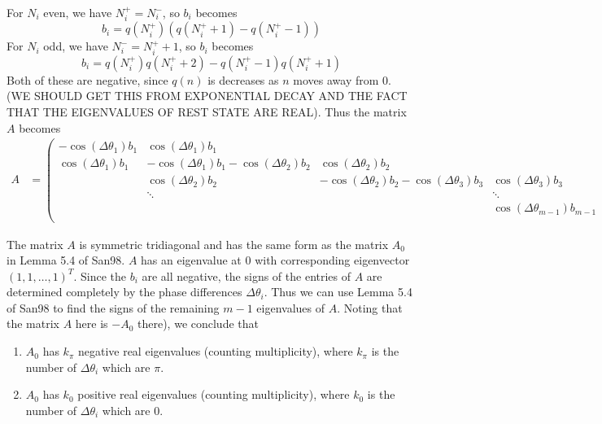 \documentclass[12pt]{article}
\begin{document}
For $N_i$ even, we have $N_i^+ = N_i^-$, so $b_i$ becomes
\[
b_i = q(N_i^+)( q(N_i^+ + 1) - q(N_i^+ - 1) )
\]
For $N_i$ odd, we have $N_i^- = N_i^+ + 1$, so $b_i$ becomes
\[
b_i = q(N_i^+)q(N_i^+ + 2) - q(N_i^+ - 1)q(N_i^+ + 1)
\]
Both of these are negative, since $q(n)$ is decreases as $n$ moves away from 0. (WE SHOULD GET THIS FROM EXPONENTIAL DECAY AND THE FACT THAT THE EIGENVALUES OF REST STATE ARE REAL). Thus the matrix $A$ becomes
\begin{align}\label{AdNLS}
A &= \begin{pmatrix}
-\cos(\Delta\theta_1) b_1 & \cos(\Delta\theta_1) b_1 & & &  \\
\cos(\Delta\theta_1) b_1 & -\cos(\Delta\theta_1) b_1 - \cos(\Delta\theta_2) b_2 & \cos(\Delta\theta_2) b_2 \\
& \cos(\Delta\theta_2) b_2 & -\cos(\Delta\theta_2) b_2 - \cos(\Delta\theta_3) b_3 & \cos(\Delta\theta_3) b_3 \\
& \ddots & & \ddots \\
& & & \cos(\Delta\theta_{m-1}) b_{m-1} & -\cos(\Delta\theta_{m-1}) b_{m-1}  \\
\end{pmatrix}
\end{align}

The matrix $A$ is symmetric tridiagonal and has the same form as the matrix $A_0$ in Lemma 5.4 of San98. $A$ has an eigenvalue at 0 with corresponding eigenvector $(1, 1, \dots, 1)^T$. Since the $b_i$ are all negative, the signs of the entries of $A$ are determined completely by the phase differences $\Delta\theta_i$. Thus we can use Lemma 5.4 of San98 to find the signs of the remaining $m-1$ eigenvalues of $A$. Noting that the matrix $A$ here is $-A_0$ there), we conclude that  
\begin{enumerate}
	\item $A_0$ has $k_\pi$ negative real eigenvalues (counting multiplicity), where $k_\pi$ is the number of $\Delta\theta_i$ which are $\pi$. 
	\item $A_0$ has $k_0$ positive real eigenvalues (counting multiplicity), where $k_0$ is the number of $\Delta\theta_i$ which are $0$. 
\end{enumerate}
\end{document}
